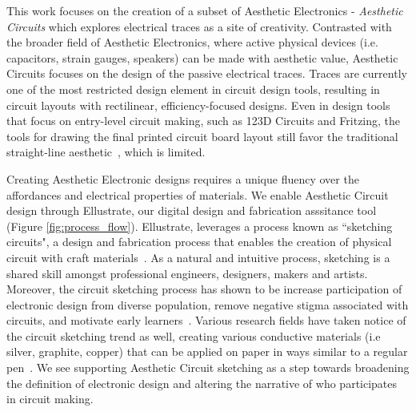 \documentclass{sigchi}
\begin{document}
This work focuses on the creation of a subset of Aesthetic Electronics - \textit{Aesthetic Circuits} which explores electrical traces as a site of creativity.
Contrasted with the broader field of Aesthetic Electronics, where active physical devices (i.e. capacitors, strain gauges, speakers) can be made with aesthetic value, Aesthetic Circuits focuses on the design of the passive electrical traces. 
Traces are currently one of the most restricted design element in circuit design tools, resulting in circuit layouts with rectilinear, efficiency-focused designs. 
Even in design tools that focus on entry-level circuit making, such as 123D Circuits and Fritzing, the tools for drawing the final printed circuit board layout still favor the traditional straight-line aesthetic~\cite{_autodesk123d_2016}, which is limited.
    


Creating Aesthetic Electronic designs requires a unique fluency over the affordances and electrical properties of materials.
We enable Aesthetic Circuit design through Ellustrate, our digital design and fabrication asssitance tool (Figure \ref{fig:process_flow}). Ellustrate, leverages a process known as ``sketching circuits", a design and fabrication process that enables the creation of physical circuit with craft materials~\cite{qi_sketching_2014, qi_stickers_2015}. As a natural and intuitive process, sketching is a shared skill amongst professional engineers, designers, makers and artists. Moreover, the circuit sketching process has shown to be increase participation of electronic design from diverse population, remove negative stigma associated with circuits, and motivate early learners~\cite{qi_stickers_2015}. Various research fields have taken notice of the circuit sketching trend as well, creating various conductive materials (i.e silver, graphite, copper) that can be applied on paper in ways similar to a regular pen~\cite{russo2011pen,Anonymous:ojhPyGTN}. We see supporting Aesthetic Circuit sketching as a step towards broadening the definition of electronic design and altering the narrative of who participates in circuit making. 
\end{document}
